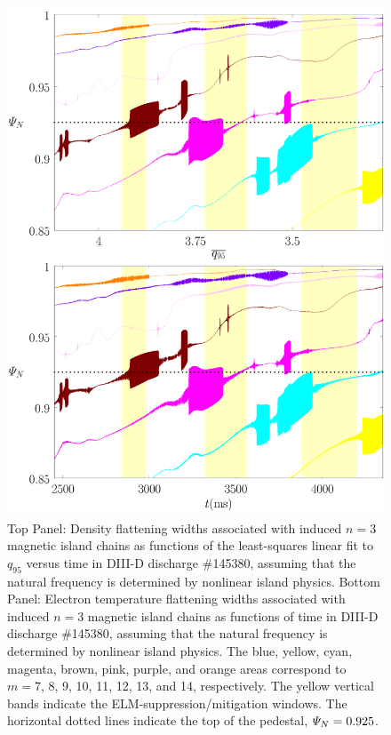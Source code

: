 \documentclass[12pt,prb,aps]{revtex4-1}
\begin{document}
\begin{figure}
\includegraphics[height=6in]{fig7.pdf}
\caption{Top Panel: Density flattening widths associated with induced $n=3$ magnetic island  chains as functions of the least-squares linear fit to $q_{95}$ versus time
in   DIII-D discharge \#145380, assuming that the natural frequency is determined by nonlinear island physics.
Bottom Panel:  Electron temperature flattening widths associated with induced $n=3$ magnetic island chains as functions of time
in   DIII-D discharge \#145380, assuming that the natural frequency is determined by nonlinear island physics. The blue, yellow, cyan, magenta, brown, pink,
purple, and orange  areas correspond to $m=7$, 8, 9, 10, 11, 12, 13, and 14, respectively. The yellow vertical bands indicate the ELM-suppression/mitigation windows. 
The horizontal dotted lines indicate the top of the pedestal, ${\mit\Psi}_N=0.925$.} \label{fig7}
\end{figure}
\end{document}
